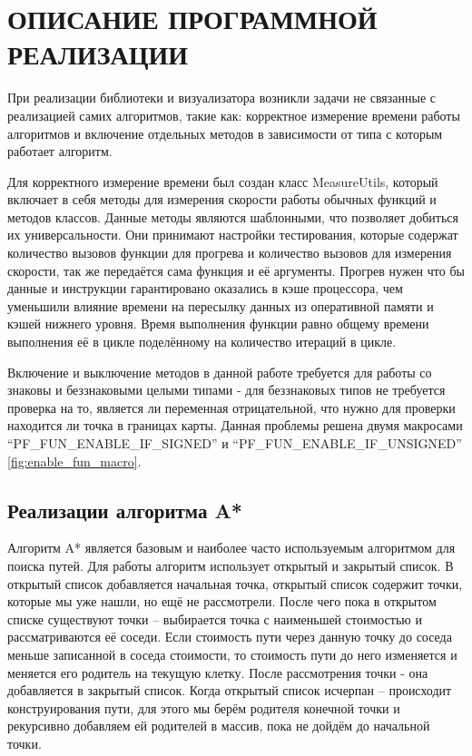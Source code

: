 \section[Описание программной реализации]{\MakeTextUppercase{ОПИСАНИЕ ПРОГРАММНОЙ РЕАЛИЗАЦИИ}}

\vspace{1\baselineskip} 

При реализации библиотеки и визуализатора возникли задачи не связанные с реализацией самих алгоритмов, такие как: корректное измерение времени работы алгоритмов и включение отдельных методов в зависимости от типа с которым работает алгоритм.

Для корректного измерение времени был создан класс MeasureUtils, который включает в себя методы для измерения скорости работы обычных функций и методов классов. Данные методы являются шаблонными, что позволяет добиться их универсальности. Они принимают настройки тестирования, которые содержат количество вызовов функции для прогрева и количество вызовов для измерения скорости, так же передаётся сама функция и её аргументы. Прогрев нужен что бы данные и инструкции гарантировано оказались в кэше процессора, чем уменьшили влияние времени на пересылку данных из оперативной памяти и кэшей нижнего уровня. Время выполнения функции равно общему времени выполнения её в цикле поделённому на количество итераций в цикле.

Включение и выключение методов в данной работе требуется для работы со знаковы и беззнаковыми целыми типами - для беззнаковых типов не требуется проверка на то, является ли переменная отрицательной, что нужно для проверки находится ли точка в границах карты. Данная проблемы решена двумя макросами  ``PF\_FUN\_ENABLE\_IF\_SIGNED'' и ``PF\_FUN\_ENABLE\_IF\_UNSIGNED'' \cref{fig:enable_fun_macro}.


\subsection{Реализации алгоритма A*}

Алгоритм A* является базовым и наиболее часто используемым алгоритмом для поиска путей. Для работы алгоритм использует открытый и закрытый список. В открытый список добавляется начальная точка, открытый список содержит точки, которые мы уже нашли, но ещё не рассмотрели. После чего пока в открытом списке существуют точки -- выбирается точка с наименьшей стоимостью и рассматриваются её соседи. Если стоимость пути через данную точку до соседа меньше записанной в соседа стоимости, то стоимость пути до него изменяется и меняется его родитель на текущую клетку. После рассмотрения точки - она добавляется в закрытый список. Когда открытый список исчерпан -- происходит конструирования пути, для этого мы берём родителя конечной точки и рекурсивно добавляем ей родителей в массив, пока не дойдём до начальной точки.

